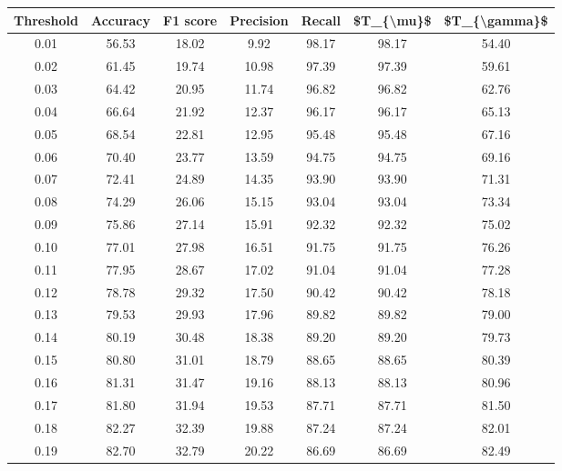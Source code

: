 \begin{tabular}{|c|c|c|c|c|c|c|}
\hline
 Threshold &  Accuracy &  F1 score &  Precision &  Recall &  \$T\_\{\textbackslash mu\}\$ &  \$T\_\{\textbackslash gamma\}\$ \\
\hline
      0.01 &     56.53 &     18.02 &       9.92 &   98.17 &      98.17 &         54.40 \\
      0.02 &     61.45 &     19.74 &      10.98 &   97.39 &      97.39 &         59.61 \\
      0.03 &     64.42 &     20.95 &      11.74 &   96.82 &      96.82 &         62.76 \\
      0.04 &     66.64 &     21.92 &      12.37 &   96.17 &      96.17 &         65.13 \\
      0.05 &     68.54 &     22.81 &      12.95 &   95.48 &      95.48 &         67.16 \\
      0.06 &     70.40 &     23.77 &      13.59 &   94.75 &      94.75 &         69.16 \\
      0.07 &     72.41 &     24.89 &      14.35 &   93.90 &      93.90 &         71.31 \\
      0.08 &     74.29 &     26.06 &      15.15 &   93.04 &      93.04 &         73.34 \\
      0.09 &     75.86 &     27.14 &      15.91 &   92.32 &      92.32 &         75.02 \\
      0.10 &     77.01 &     27.98 &      16.51 &   91.75 &      91.75 &         76.26 \\
      0.11 &     77.95 &     28.67 &      17.02 &   91.04 &      91.04 &         77.28 \\
      0.12 &     78.78 &     29.32 &      17.50 &   90.42 &      90.42 &         78.18 \\
      0.13 &     79.53 &     29.93 &      17.96 &   89.82 &      89.82 &         79.00 \\
      0.14 &     80.19 &     30.48 &      18.38 &   89.20 &      89.20 &         79.73 \\
      0.15 &     80.80 &     31.01 &      18.79 &   88.65 &      88.65 &         80.39 \\
      0.16 &     81.31 &     31.47 &      19.16 &   88.13 &      88.13 &         80.96 \\
      0.17 &     81.80 &     31.94 &      19.53 &   87.71 &      87.71 &         81.50 \\
      0.18 &     82.27 &     32.39 &      19.88 &   87.24 &      87.24 &         82.01 \\
      0.19 &     82.70 &     32.79 &      20.22 &   86.69 &      86.69 &         82.49 \\

\end{tabular}
